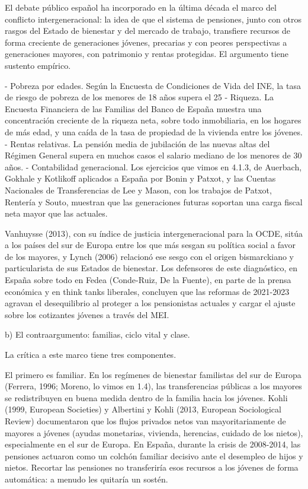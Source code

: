 \documentclass[10pt,a4paper]{article}
\begin{document}
El debate público español ha incorporado en la última década el marco del conflicto intergeneracional: la idea de que el sistema de pensiones, junto con otros rasgos del Estado de bienestar y del mercado de trabajo, transfiere recursos de forma creciente de generaciones jóvenes, precarias y con peores perspectivas a generaciones mayores, con patrimonio y rentas protegidas. El argumento tiene sustento empírico.

- Pobreza por edades. Según la Encuesta de Condiciones de Vida del INE, la tasa de riesgo de pobreza de los menores de 18 años supera el 25%
- Riqueza. La Encuesta Financiera de las Familias del Banco de España muestra una concentración creciente de la riqueza neta, sobre todo inmobiliaria, en los hogares de más edad, y una caída de la tasa de propiedad de la vivienda entre los jóvenes.
- Rentas relativas. La pensión media de jubilación de las nuevas altas del Régimen General supera en muchos casos el salario mediano de los menores de 30 años.
- Contabilidad generacional. Los ejercicios que vimos en 4.1.3, de Auerbach, Gokhale y Kotlikoff aplicados a España por Bonin y Patxot, y las Cuentas Nacionales de Transferencias de Lee y Mason, con los trabajos de Patxot, Rentería y Souto, muestran que las generaciones futuras soportan una carga fiscal neta mayor que las actuales.

Vanhuysse (2013), con su índice de justicia intergeneracional para la OCDE, sitúa a los países del sur de Europa entre los que más sesgan su política social a favor de los mayores, y Lynch (2006) relacionó ese sesgo con el origen bismarckiano y particularista de sus Estados de bienestar. Los defensores de este diagnóstico, en España sobre todo en Fedea (Conde-Ruiz, De la Fuente), en parte de la prensa económica y en think tanks liberales, concluyen que las reformas de 2021-2023 agravan el desequilibrio al proteger a los pensionistas actuales y cargar el ajuste sobre los cotizantes jóvenes a través del MEI.

b) El contraargumento: familias, ciclo vital y clase.

La crítica a este marco tiene tres componentes.

El primero es familiar. En los regímenes de bienestar familistas del sur de Europa (Ferrera, 1996; Moreno, lo vimos en 1.4), las transferencias públicas a los mayores se redistribuyen en buena medida dentro de la familia hacia los jóvenes. Kohli (1999, European Societies) y Albertini y Kohli (2013, European Sociological Review) documentaron que los flujos privados netos van mayoritariamente de mayores a jóvenes (ayudas monetarias, vivienda, herencias, cuidado de los nietos), especialmente en el sur de Europa. En España, durante la crisis de 2008-2014, las pensiones actuaron como un colchón familiar decisivo ante el desempleo de hijos y nietos. Recortar las pensiones no transferiría esos recursos a los jóvenes de forma automática: a menudo les quitaría un sostén.
\end{document}
